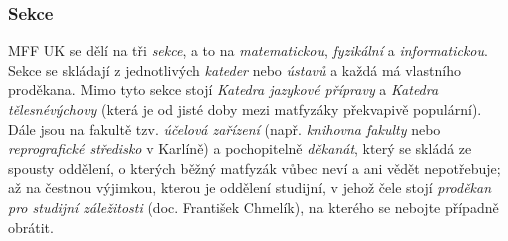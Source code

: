 \subsubsection{Sekce}
MFF UK se dělí na tři \textit{sekce}, a to na \textit{matematickou},
\textit{fyzikální} a \textit{informatickou}. Sekce se skládají z jednotlivých
\textit{kateder} nebo \textit{ústavů} a každá má vlastního proděkana. Mimo tyto
sekce stojí \textit{Katedra jazykové přípravy} a \textit{Katedra tělesnévýchovy}
(která je od jisté doby mezi matfyzáky překvapivě populární). Dále jsou na
fakultě tzv. \textit{účelová zařízení} (např. \textit{knihovna fakulty} nebo
\textit{reprografické středisko} v Karlíně) a pochopitelně \textit{děkanát},
který se skládá ze spousty oddělení, o kterých běžný matfyzák vůbec neví a ani
vědět nepotřebuje; až na čestnou výjimkou, kterou je oddělení studijní, v jehož
čele stojí \textit{proděkan pro studijní záležitosti} (doc. František Chmelík),
na kterého se nebojte případně obrátit.
